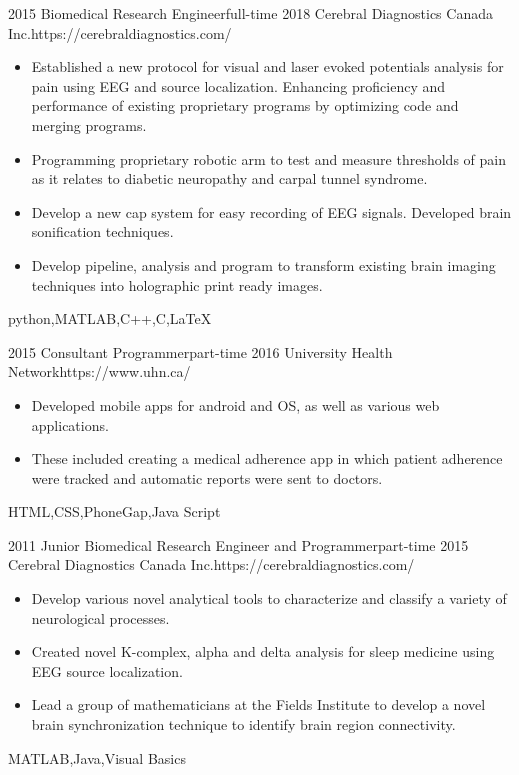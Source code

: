 \begin{experiences}
	\myExperience
	{2015}       {Biomedical Research Engineer}{full-time}
	{2018}      {Cerebral Diagnostics Canada Inc.}{https://cerebraldiagnostics.com/}
	{
		\begin{itemize}
		\item Established a new protocol for visual and laser evoked potentials analysis for pain using EEG and source localization. Enhancing proficiency and performance of existing proprietary programs by optimizing code and merging programs.
		\item Programming proprietary robotic arm to test and measure thresholds of pain as it relates to diabetic neuropathy and carpal tunnel syndrome.
		\item Develop a new cap system for easy recording of EEG signals. Developed brain sonification techniques.
		\item Develop pipeline, analysis and program to transform existing brain imaging techniques into holographic print ready images.
		\end{itemize}
	}
	{python,MATLAB,C++,C,\LaTeX}
	
	\emptySeparator
	
	\myExperience
	{2015}       {Consultant Programmer}{part-time}
	{2016}      {University Health Network}{https://www.uhn.ca/}
	{
		\begin{itemize}
			\item Developed mobile apps for android and OS, as well as various web applications.
			\item These included creating a medical adherence app in which patient adherence were tracked and automatic reports were sent to doctors.
		\end{itemize}
	}
	{HTML,CSS,PhoneGap,Java Script}
	
	\emptySeparator
	
	\myExperience
	{2011}       {Junior Biomedical Research Engineer and Programmer}{part-time}
	{2015}      {Cerebral Diagnostics Canada Inc.}{https://cerebraldiagnostics.com/}
	{
		\begin{itemize}
			\item Develop various novel analytical tools to characterize and classify a variety of neurological processes.
			\item Created novel K-complex, alpha and delta analysis for sleep medicine using EEG source localization.
			\item Lead a group of mathematicians at the Fields Institute to develop a novel brain synchronization technique to identify brain region connectivity.
		\end{itemize}
	}
	{MATLAB,Java,Visual Basics}
	

\end{experiences}
